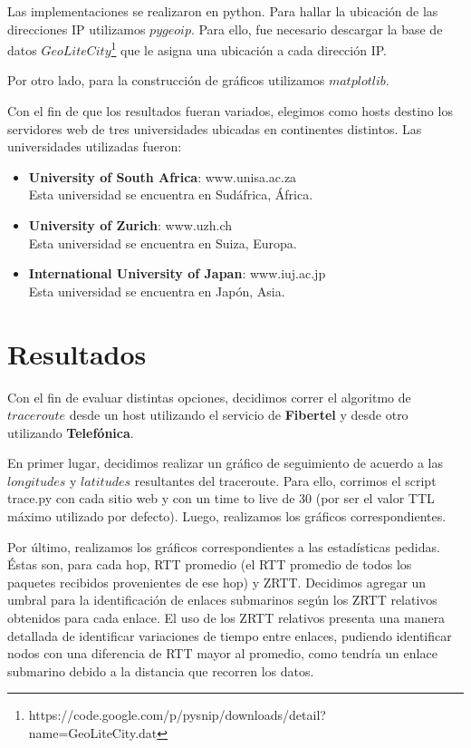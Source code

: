 \documentclass[10pt, a4paper]{article}
\begin{document}
Las implementaciones se realizaron en python. Para hallar la ubicación de las direcciones IP utilizamos $pygeoip$. Para ello, fue necesario descargar la base de datos $GeoLiteCity$\footnote{https://code.google.com/p/pysnip/downloads/detail?name=GeoLiteCity.dat} que le asigna una ubicación a cada dirección IP.

Por otro lado, para la construcción de gráficos utilizamos $matplotlib$.

Con el fin de que los resultados fueran variados, elegimos como hosts destino los servidores web de tres universidades ubicadas en continentes distintos.
Las universidades utilizadas fueron:
\begin{itemize}
\item \textbf{University of South Africa}: www.unisa.ac.za\\
Esta universidad se encuentra en Sudáfrica, África.
\item \textbf{University of Zurich}: www.uzh.ch\\
Esta universidad se encuentra en Suiza, Europa.
\item \textbf{International University of Japan}: www.iuj.ac.jp\\
Esta universidad se encuentra en Japón, Asia.
\end{itemize}
\newpage
\section{Resultados}
Con el fin de evaluar distintas opciones, decidimos correr el algoritmo de $traceroute$ desde un host utilizando el servicio de \textbf{Fibertel} y desde otro utilizando \textbf{Telefónica}.

En primer lugar, decidimos realizar un gráfico de seguimiento de acuerdo a las $longitudes$ y $latitudes$ resultantes del traceroute. Para ello, corrimos el script trace.py con cada sitio web y con un time to live de 30 (por ser el valor TTL máximo utilizado por defecto). Luego, realizamos los gráficos correspondientes.

Por último, realizamos los gráficos correspondientes a las estadísticas pedidas. Éstas son, para cada hop, RTT promedio (el RTT promedio de todos los paquetes recibidos provenientes de ese hop) y ZRTT. Decidimos agregar un umbral para la identificación de enlaces submarinos según los ZRTT relativos obtenidos para cada enlace. El uso de los ZRTT relativos presenta una manera detallada de identificar variaciones de tiempo entre enlaces, pudiendo identificar nodos con una diferencia de RTT mayor al promedio, como tendría un enlace submarino debido a la distancia que recorren los datos. 
\end{document}
